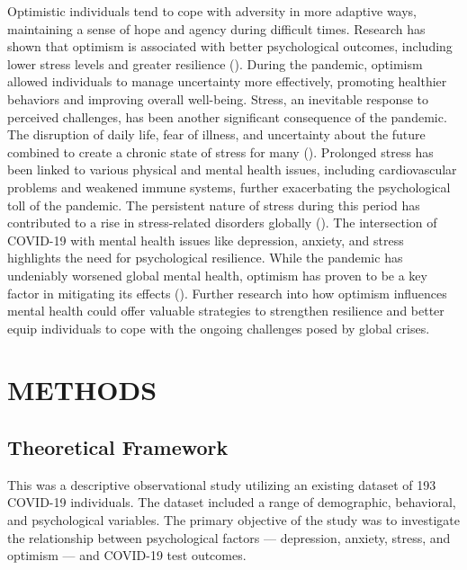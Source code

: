 \documentclass[a4paper]{article}
\begin{document}
Optimistic individuals tend to cope with adversity in more adaptive ways, maintaining a sense of hope and agency during difficult times.
Research has shown that optimism is associated with better psychological outcomes, including lower stress levels and greater resilience (\citet{Lee2019OptimismLongevity}). During the pandemic,
optimism allowed individuals to manage uncertainty more effectively, promoting healthier behaviors and improving overall well-being.
\vspace{0.5em}\newline
Stress, an inevitable response to perceived challenges, has been another significant consequence of the pandemic.
The disruption of daily life, fear of illness, and uncertainty about the future combined to create a chronic state of stress for many (\citet{Cohen2016PsychologicalStressDisease}).
Prolonged stress has been linked to various physical and mental health issues,
including cardiovascular problems and weakened immune systems, further exacerbating the psychological toll of the pandemic.
The persistent nature of stress during this period has contributed to a rise in stress-related disorders globally (\citet{NIMH2023StressImpactCOVID}).
\vspace{0.5em}\newline
The intersection of COVID-19 with mental health issues like depression, anxiety, and stress highlights the need for psychological resilience.
While the pandemic has undeniably worsened global mental health, optimism has proven to be a key factor in mitigating its effects (\citet{Conversano2020MindfulnessResilience}). Further research into 
how optimism influences mental health could offer valuable strategies to strengthen resilience and better equip individuals to cope with the ongoing challenges posed by global crises.


\vspace{2em}
\section{METHODS}
\subsection{Theoretical Framework}
\vspace{0.5em}
This was a descriptive observational study utilizing an existing dataset of 193 COVID-19 individuals.
The dataset included a range of demographic, behavioral, and psychological variables.
The primary objective of the study was to investigate the relationship between psychological factors — depression, anxiety, stress, and optimism — and COVID-19 test outcomes.
\end{document}
